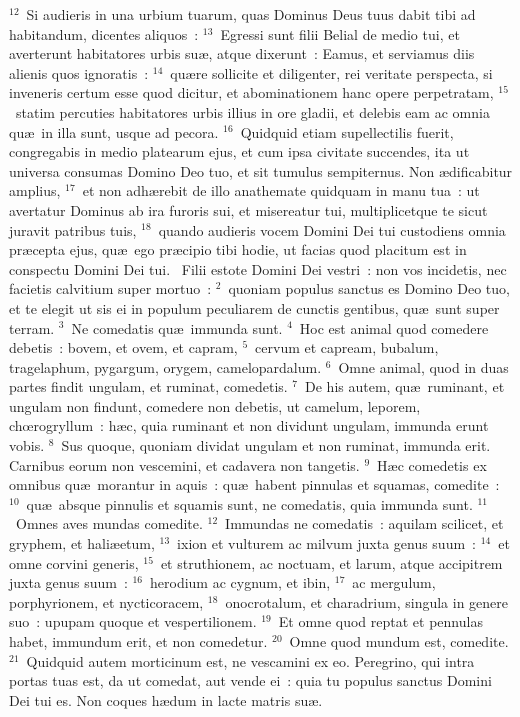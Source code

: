 ${}^{12}$~Si audieris in una urbium tuarum, quas Dominus Deus tuus dabit tibi ad habitandum, dicentes aliquos~:
${}^{13}$~Egressi sunt filii Belial de medio tui, et averterunt habitatores urbis su\ae , atque dixerunt~: Eamus, et serviamus diis alienis quos ignoratis~:
${}^{14}$~qu\ae re sollicite et diligenter, rei veritate perspecta, si inveneris certum esse quod dicitur, et abominationem hanc opere perpetratam,
${}^{15}$~statim percuties habitatores urbis illius in ore gladii, et delebis eam ac omnia qu\ae\ in illa sunt, usque ad pecora.
${}^{16}$~Quidquid etiam supellectilis fuerit, congregabis in medio platearum ejus, et cum ipsa civitate succendes, ita ut universa consumas Domino Deo tuo, et sit tumulus sempiternus. Non \ae dificabitur amplius,
${}^{17}$~et non adh\ae rebit de illo anathemate quidquam in manu tua~: ut avertatur Dominus ab ira furoris sui, et misereatur tui, multiplicetque te sicut juravit patribus tuis,
${}^{18}$~quando audieris vocem Domini Dei tui custodiens omnia pr\ae cepta ejus, qu\ae\ ego pr\ae cipio tibi hodie, ut facias quod placitum est in conspectu Domini Dei tui.
~Filii estote Domini Dei vestri~: non vos incidetis, nec facietis calvitium super mortuo~:
${}^{2}$~quoniam populus sanctus es Domino Deo tuo, et te elegit ut sis ei in populum peculiarem de cunctis gentibus, qu\ae\ sunt super terram.
${}^{3}$~Ne comedatis qu\ae\ immunda sunt.
${}^{4}$~Hoc est animal quod comedere debetis~: bovem, et ovem, et capram,
${}^{5}$~cervum et capream, bubalum, tragelaphum, pygargum, orygem, camelopardalum.
${}^{6}$~Omne animal, quod in duas partes findit ungulam, et ruminat, comedetis.
${}^{7}$~De his autem, qu\ae\ ruminant, et ungulam non findunt, comedere non debetis, ut camelum, leporem, chœrogryllum~: h\ae c, quia ruminant et non dividunt ungulam, immunda erunt vobis.
${}^{8}$~Sus quoque, quoniam dividat ungulam et non ruminat, immunda erit. Carnibus eorum non vescemini, et cadavera non tangetis.
${}^{9}$~H\ae c comedetis ex omnibus qu\ae\ morantur in aquis~: qu\ae\ habent pinnulas et squamas, comedite~:
${}^{10}$~qu\ae\ absque pinnulis et squamis sunt, ne comedatis, quia immunda sunt.
${}^{11}$~Omnes aves mundas comedite.
${}^{12}$~Immundas ne comedatis~: aquilam scilicet, et gryphem, et hali\ae etum,
${}^{13}$~ixion et vulturem ac milvum juxta genus suum~:
${}^{14}$~et omne corvini generis,
${}^{15}$~et struthionem, ac noctuam, et larum, atque accipitrem juxta genus suum~:
${}^{16}$~herodium ac cygnum, et ibin,
${}^{17}$~ac mergulum, porphyrionem, et nycticoracem,
${}^{18}$~onocrotalum, et charadrium, singula in genere suo~: upupam quoque et vespertilionem.
${}^{19}$~Et omne quod reptat et pennulas habet, immundum erit, et non comedetur.
${}^{20}$~Omne quod mundum est, comedite.
${}^{21}$~Quidquid autem morticinum est, ne vescamini ex eo. Peregrino, qui intra portas tuas est, da ut comedat, aut vende ei~: quia tu populus sanctus Domini Dei tui es. Non coques h\ae dum in lacte matris su\ae .


